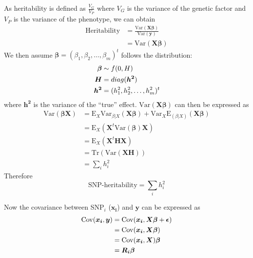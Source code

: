 \documentclass[12pt]{scrbook}
\begin{document}
As heritability is defined as $\frac{V_G}{V_P}$ where $V_G$ is the variance of the genetic factor and $V_P$ is the variance of the phenotype, we can obtain
\begin{align}
\text{Heritability}&=\frac{\mathrm{Var}(\boldsymbol{X}\boldsymbol{\beta})}{\mathrm{Var}(\boldsymbol{y})}\\
&=\mathrm{Var}(\boldsymbol{X}\boldsymbol{\beta})
\end{align}
We then assume $\boldsymbol{\beta} = (\beta_1, \beta_2,\dots,\beta_m)^t$ follows the distribution:
\begin{align*}
\boldsymbol{\beta}&\sim f(0,\boldmath{H})\\
\boldsymbol{H}&=diag(\boldsymbol{h^2})\\
\boldsymbol{h^2}&=(h_1^2,h_2^2,\dots,h_m^2)^t
\end{align*}
where $\boldsymbol{h^2}$ is the variance of the ``true'' effect. 
$\mathrm{Var}(\boldsymbol{X}\boldsymbol{\beta})$ can then be expressed as
\begin{align}
\mathrm{Var}(\boldsymbol{\beta}\boldsymbol{X}) &= \mathrm{E}_X\mathrm{Var}_{\beta|X}(\boldsymbol{X}\boldsymbol{\beta})+\mathrm{Var}_X\mathrm{E}_{(\beta|X)}(\boldsymbol{X}\boldsymbol{\beta}) \nonumber\\
&=\mathrm{E}_X(\boldsymbol{X}^t\mathrm{Var}(\boldsymbol{\beta})\boldsymbol{X}) \nonumber\\ 
&= \mathrm{E}_X(\boldsymbol{X}^t\boldsymbol{HX}) \nonumber\\
&=\mathrm{Tr}(\mathrm{Var}(\boldsymbol{X}\boldsymbol{H})) \nonumber\\
&=\sum_ih_i^2
\label{eq:proveHerit}
\end{align}
Therefore
\begin{equation}
\text{SNP-heritability}=\sum_ih_i^2
\label{eq:sumH}
\end{equation}

Now the covariance between \gls{SNP}$_i$ ($\boldsymbol{x_i}$) and $\boldsymbol{y}$ can be expressed as 
\begin{align}
\mathrm{Cov}(\boldsymbol{x_i}, \boldsymbol{y})&=\mathrm{Cov}(\boldsymbol{x_i},\boldsymbol{X\beta}+\boldsymbol{\epsilon})\notag\\
&=\mathrm{Cov}(\boldsymbol{x_i},\boldsymbol{X\beta})\notag\\
&=\mathrm{Cov}(\boldsymbol{x_i},\boldsymbol{X})\boldsymbol{\beta}\notag\\
&=\boldsymbol{R_i\beta}
\end{align}
\end{document}
